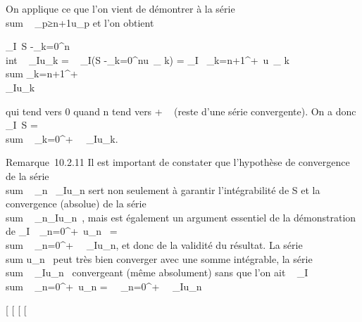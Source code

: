 \documentclass[]{article}
\begin{document}
On applique ce que l'on vient de démontrer à la série
\\sum ~
\_p≥n+1u\_p et l'on obtient

\left \textbar{}\int  \_I~S
-\sum \_k=0^n~
\\int  ~
\_Iu\_k\right \textbar{} =
\left \textbar{}\int ~
\_I(S -\sum \_k=0^nu~\_
k)\right \textbar{} = \left
\textbar{}\int  \_I~
\sum \_k=n+1^+\infty~u~\_
k\right \textbar{}\leq\\sum
\_k=n+1^+\infty~\\\int
  \_I\textbar{}u\_k\textbar{}

qui tend vers 0 quand n tend vers + \infty~ (reste d'une série convergente).
On a donc \int  \_I~S
= \\sum ~
\_k=0^+\infty~\int ~
\_Iu\_k.

Remarque~10.2.11 Il est important de constater que l'hypothèse de
convergence de la série
\\sum ~
\_n\int ~
\_I\textbar{}u\_n\textbar{} sert non seulement à garantir
l'intégrabilité de S et la convergence (absolue) de la série
\\sum ~
\_n\int  \_Iu\_n~, mais est
également un argument essentiel de la démonstration de
\int  \_I~\
\sum  \_n=0^+\infty~u\_n~
= \\sum ~
\_n=0^+\infty~\int ~
\_Iu\_n, et donc de la validité du résultat. La série
\\sum  u\_n~ peut
très bien converger avec une somme intégrable, la série
\\sum ~
\int  \_Iu\_n~ convergeant (même
absolument) sans que l'on ait \int ~
\_I \\sum ~
\_n=0^+\infty~u\_n =\
\sum ~
\_n=0^+\infty~\int ~
\_Iu\_n

{[}
{[}
{[}
{[}
\end{document}
